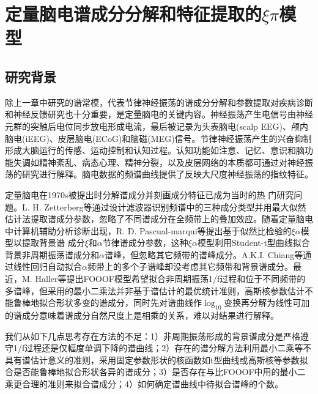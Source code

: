 \chapter{定量脑电谱成分分解和特征提取的\texorpdfstring{$\xi\pi$}{ξπ}模型}
\section{研究背景}
除上一章中研究的谱常模，代表节律神经振荡的谱成分分解和参数提取对疾病诊断和神经反馈研究也十分重要，是定量脑电的关键内容。神经振荡产生电信号由神经元群的突触后电位同步放电形成电流，最后被记录为头表脑电(scalp EEG)、颅内脑电(iEEG)、皮层脑电(ECoG)和脑磁(MEG)信号。节律神经振荡产生的兴奋抑制形成大脑运行的传感、运动控制和认知过程。认知功能如注意、记忆、意识和脑功能失调如精神紊乱、病态心理、精神分裂，以及皮层网络的本质都可通过对神经振荡的研究进行解释。脑电数据的频谱曲线提供了反映大尺度神经振荡的指纹特征。

定量脑电在1970s被提出时分解谱成分并刻画成分特征已成为当时的热
门研究问题。L. H. Zetterberg等通过设计滤波器识别频谱中的三种成分类型并用最大似然估计法提取谱成分参数，忽略了不同谱成分在全频带上的叠加效应。随着定量脑电中计算机辅助分析诊断出现，R. D. Pascual-marqui等提出基于似然比检验的$\xi\alpha$模型以提取背景谱
成分$\xi$和$\alpha$节律谱成分参数，这种$\xi\alpha$模型利用Student-t型曲线拟合背景非周期振荡谱成分和$\alpha$谱峰，但忽略其它频带的谱峰成分。A.K.I. Chiang等通过线性回归自动拟合$\alpha$频带上的多个子谱峰却没考虑其它频带和背景谱成分。最近，M. Haller等提出FOOOF模型希望拟合非周期振荡1/f过程和位于不同频带的多谱峰，但采用的最小二乘法并非基于谱估计的最优统计准则，高斯核参数估计不能鲁棒地拟合形状多变的谱成分，同时先对谱曲线作$\log_{10}$变换再分解为线性可加的谱成分意味着谱成分自然尺度上是相乘的关系，难以对结果进行解释。

我们从如下几点思考存在方法的不足：1）非周期振荡形成的背景谱成分是严格遵守1/f过程还是仅幅度单调下降的谱曲线；2）存在的谱分解方法利用最小二乘等不具有谱估计意义的准则，采用固定参数形状的核函数如t型曲线或高斯核等参数拟合是否能鲁棒地拟合形状各异的谱成分；3）是否存在与比FOOOF中用的最小二乘更合理的准则来拟合谱成分；4）如何确定谱曲线中待拟合谱峰的个数。


